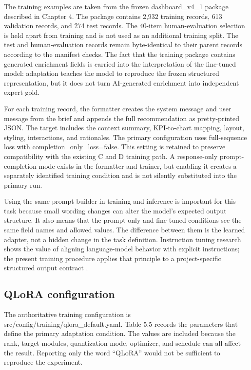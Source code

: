 The training examples are taken from the frozen dashboard\_v4\_1 package described in Chapter 4. The package contains 2,932 training records, 613 validation records, and 274 test records. The 40-item human-evaluation selection is held apart from training and is not used as an additional training split. The test and human-evaluation records remain byte-identical to their parent records according to the manifest checks. The fact that the training package contains generated enrichment fields is carried into the interpretation of the fine-tuned model: adaptation teaches the model to reproduce the frozen structured representation, but it does not turn AI-generated enrichment into independent expert gold.

For each training record, the formatter creates the system message and user message from the brief and appends the full recommendation as pretty-printed JSON. The target includes the context summary, KPI-to-chart mapping, layout, styling, interactions, and rationales. The primary configuration uses full-sequence loss with completion\_only\_loss=false. This setting is retained to preserve compatibility with the existing C and D training path. A response-only prompt-completion mode exists in the formatter and trainer, but enabling it creates a separately identified training condition and is not silently substituted into the primary run.

Using the same prompt builder in training and inference is important for this task because small wording changes can alter the model's expected output structure. It also means that the prompt-only and fine-tuned conditions see the same field names and allowed values. The difference between them is the learned adapter, not a hidden change in the task definition. Instruction tuning research shows the value of aligning language-model behavior with explicit instructions; the present training procedure applies that principle to a project-specific structured output contract \cite{wei2022flan}.

\subsection{QLoRA configuration}

The authoritative training configuration is src/config/training/qlora\_default.yaml. Table 5.5 records the parameters that define the primary adaptation condition. The values are included because the rank, target modules, quantization mode, optimizer, and schedule can all affect the result. Reporting only the word ``QLoRA'' would not be sufficient to reproduce the experiment.

